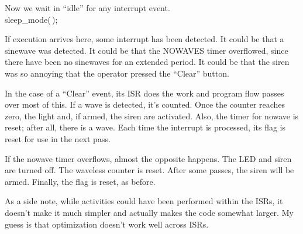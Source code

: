 Now we wait in ``idle'' for any interrupt event.
\Y\B\\{sleep\_mode}(\,);\par
\fi

If execution arrives here, some interrupt has been detected.
It could be that a sinewave was detected.
It could be that the NOWAVES timer overflowed, since there have been no
sinewaves for an extended period.
It could be that the siren was so annoying that the operator pressed the
``Clear'' button.

In the case of a ``Clear'' event, its ISR does the work and program flow passes
over most of this.
If a wave is detected, it's counted. Once the counter reaches zero, the light
and, if armed, the siren are activated. Also, the timer for nowave is reset;
after all, there is a wave. Each time the interrupt is processed, its flag is
reset for use in the next pass.

If the nowave timer overflows, almost the opposite happens. The LED and siren
are turned off. The waveless counter is reset. After some passes, the siren
will be armed. Finally, the flag is reset, as before.

As a side note, while activities could have been performed within the ISRs, it
doesn't make it much simpler and actually makes the code somewhat larger.
My guess is that optimization doesn't work well across ISRs.

